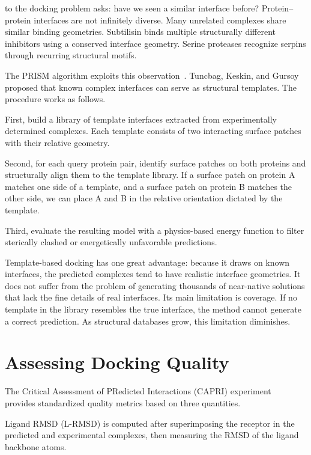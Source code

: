  to the docking problem asks: have we seen a similar interface before?
Protein--protein interfaces are not infinitely diverse.
Many unrelated complexes share similar binding geometries.
Subtilisin binds multiple structurally different inhibitors using a conserved interface geometry.
Serine proteases recognize serpins through recurring structural motifs.

The PRISM algorithm exploits this observation~\cite{tuncbag2011}.
Tuncbag, Keskin, and Gursoy proposed that known complex interfaces can serve as structural templates.
The procedure works as follows.

First, build a library of template interfaces extracted from experimentally determined complexes.
Each template consists of two interacting surface patches with their relative geometry.

Second, for each query protein pair, identify surface patches on both proteins and structurally align them to the template library.
If a surface patch on protein A matches one side of a template, and a surface patch on protein B matches the other side, we can place A and B in the relative orientation dictated by the template.

Third, evaluate the resulting model with a physics-based energy function to filter sterically clashed or energetically unfavorable predictions.

Template-based docking has one great advantage: because it draws on known interfaces, the predicted complexes tend to have realistic interface geometries.
It does not suffer from the problem of generating thousands of near-native solutions that lack the fine details of real interfaces.
Its main limitation is coverage.
If no template in the library resembles the true interface, the method cannot generate a correct prediction.
As structural databases grow, this limitation diminishes.

\section{Assessing Docking Quality}
\label{sec:docking-quality}

The Critical Assessment of PRedicted Interactions (CAPRI) experiment~\cite{janin2003capri} provides standardized quality metrics based on three quantities.

Ligand RMSD (L-RMSD) is computed after superimposing the receptor in the predicted and experimental complexes, then measuring the RMSD of the ligand backbone atoms.

